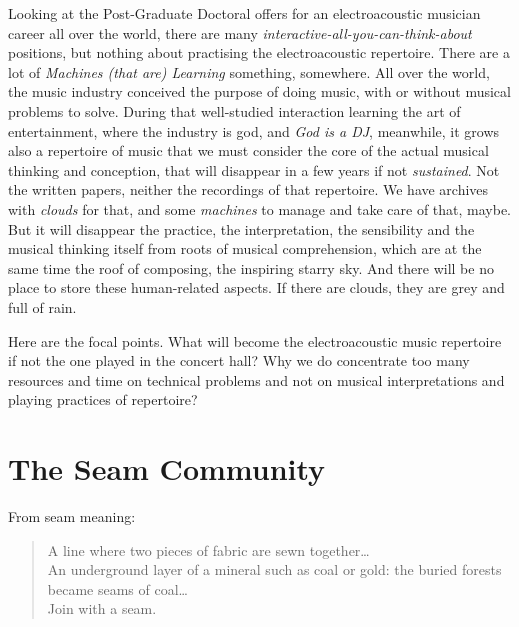 \documentclass[twoside,a4paper]{article}
\begin{document}
Looking at the Post-Graduate Doctoral offers for an electroacoustic musician
career all over the world, there are many \emph{interactive-all-you-can-think-about}
positions, but nothing about practising the electroacoustic repertoire. There are
a lot of \emph{Machines (that are) Learning} something, somewhere. All over the
world, the music industry conceived the purpose of doing music, with or without
musical problems to solve. During that well-studied interaction learning the art
of entertainment, where the industry is god, and \emph{God is a DJ}, meanwhile,
it grows also a repertoire of music that we must consider the core of the actual
musical thinking and conception, that will disappear in a few years if not
\emph{sustained}. Not the written papers, neither the recordings of that
repertoire. We have archives with \emph{clouds} for that, and some \emph{machines}
to manage and take care of that, maybe. But it will disappear the practice, the
interpretation, the sensibility and the musical thinking itself from roots of
musical comprehension, which are at the same time the roof of composing, the
inspiring starry sky. And there will be no place to store these human-related
aspects. If there are clouds, they are grey and full of rain.

Here are the focal points. What will become the electroacoustic music repertoire
if not the one played in the concert hall? Why we do concentrate too many
resources and time on technical problems and not on musical interpretations and
playing practices of repertoire?


\section{The Seam Community}
\label{sec:seam}

From seam meaning:

\begin{quote}
\begin{it}
A line where two pieces of fabric are sewn together\ldots \\
An underground layer of a mineral such as coal or gold: the buried forests
became seams of coal\ldots\\
Join with a seam.
\end{it}
\end{quote}
\end{document}
